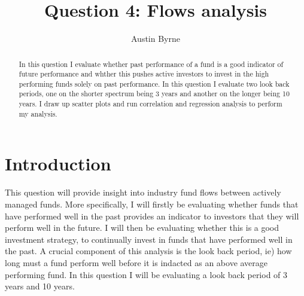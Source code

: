 \documentclass[11pt,preprint, authoryear]{elsarticle}
\numberwithin{equation}{section}
\numberwithin{figure}{section}
\numberwithin{table}{section}
\begin{document}
\begin{frontmatter}  %

\title{Question 4: Flows analysis}





\author[Add1]{Austin Byrne}





\address[Add1]{The best quantitative analyst ever seen, Stellenbosh}


\begin{abstract}
\small{
In this question I evaluate whether past performance of a fund is a good
indicator of future performance and whther this pushes active investors
to invest in the high performing funds solely on past performance. In
this question I evaluate two look back periods, one on the shorter
spectrum being 3 years and another on the longer being 10 years. I draw
up scatter plots and run correlation and regression analysis to perform
my analysis.
}
\end{abstract}

\vspace{1cm}





\vspace{0.5cm}

\end{frontmatter}

\setcounter{footnote}{0}



\pagestyle{fancy}
\chead{}
\rhead{}
\lfoot{}
\lhead{}
\cfoot{}


\headsep 35pt %




\hypertarget{introduction}{%
\section{\texorpdfstring{Introduction
\label{Introduction}}{Introduction }}\label{introduction}}

This question will provide insight into industry fund flows between
actively managed funds. More specifically, I will firstly be evaluating
whether funds that have performed well in the past provides an indicator
to investors that they will perform well in the future. I will then be
evaluating whether this is a good investment strategy, to continually
invest in funds that have performed well in the past. A crucial
component of this analysis is the look back period, ie) how long must a
fund perform well before it is indacted as an above average performing
fund. In this question I will be evaluating a look back period of 3
years and 10 years.
\end{document}

